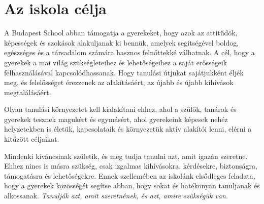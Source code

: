 \hypertarget{az-iskola-celja}{%
\section{Az iskola célja}\label{az-iskola-celja}}

A Budapest School abban támogatja a gyerekeket, hogy azok az attitűdök,
képességek és szokások alakuljanak ki bennük, amelyek segítségével
boldog, egészséges és a társadalom számára hasznos felnőttekké
válhatnak. A cél, hogy a gyerekek a mai világ szükségleteihez és
lehetőségeihez a saját erősségeik felhasználásával kapcsolódhassanak.
Hogy tanulási útjukat sajátjukként éljék meg, és felelősséget érezzenek
az alakításáért, az újabb és újabb kihívások megtalálásáért.

Olyan tanulási környezetet kell kialakítani ehhez, ahol a szülők,
tanárok és gyerekek tesznek magukért és egymásért, ahol gyerekeink
képesek nehéz helyzetekben is életük, kapcsolataik és környezetük aktív
alakítói lenni, elérni a kitűzött céljaikat.

Mindenki kíváncsinak születik, és meg tudja tanulni azt, amit igazán
szeretne. Ehhez nincs is másra szükség, csak izgalmas kihívásokra,
kérdésekre, biztonságra, támogatásra és lehetőségekre. Ennek szellemében
az iskolánk elsődleges feladata, hogy a gyerekek közösségét segítse
abban, hogy sokat és hatékonyan tanuljanak és alkossanak. \emph{Tanulják
azt, amit szeretnének, és azt, amire szükségük van.}
